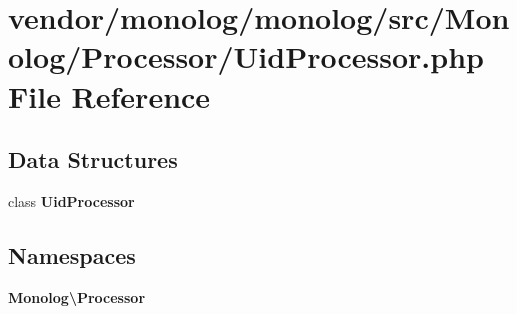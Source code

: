 \section{vendor/monolog/monolog/src/\+Monolog/\+Processor/\+Uid\+Processor.php File Reference}
\label{_uid_processor_8php}
\subsection*{Data Structures}
\begin{DoxyCompactItemize}
\item 
class {\bf Uid\+Processor}
\end{DoxyCompactItemize}
\subsection*{Namespaces}
\begin{DoxyCompactItemize}
\item 
 {\bf Monolog\textbackslash{}\+Processor}
\end{DoxyCompactItemize}
